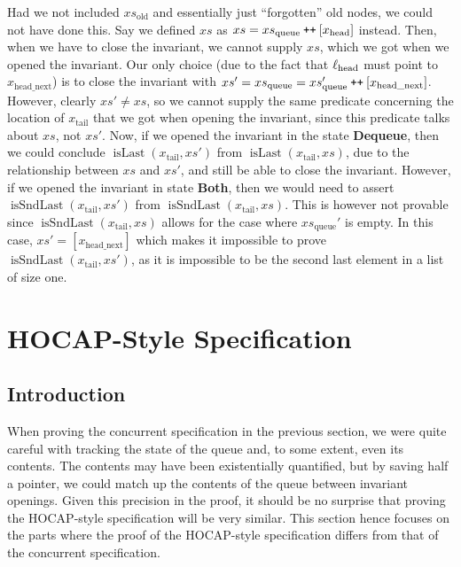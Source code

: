 \documentclass[a4paper, 10pt]{report}
\theoremstyle{definition}
\newcommand{\xsc}{xs}
\newcommand{\xsqueue}{xs_{\mathrm{queue}}}
\newcommand{\xsold}{xs_{\mathrm{old}}}
\newcommand{\isLast}{\operatorname{isLast}}
\newcommand{\isSndLast}{\operatorname{isSndLast}}
\newcommand{\locN}[1]{\loc_{\mathrm{#1}}}
\newcommand{\lochead}{\locN{head}}
\newcommand{\node}{x}
\newcommand{\nodeN}[1]{\node_{\mathrm{#1}}}
\newcommand{\nodehead}{\nodeN{head}}
\newcommand{\nodetail}{\nodeN{tail}}
\newcommand{\nodeheadnext}{\nodeN{head\_next}}
\newcommand{\DequeueState}{\textbf{Dequeue}\xspace}
\newcommand{\BothState}{\textbf{Both}\xspace}
\newcommand\catenate{\mathbin{\text{\ttfamily\upshape ++}}}
\begin{document}
Had we not included $\xsold$ and essentially just ``forgotten'' old nodes, we could not have done this. Say we defined $\xsc$ as $\xsc = \xsqueue \catenate [\nodehead]$ instead. Then, when we have to close the invariant, we cannot supply $\xsc$, which we got when we opened the invariant. Our only choice (due to the fact that $\lochead$ must point to $\nodeheadnext$) is to close the invariant with $\xsc' = \xsqueue = \xsqueue' \catenate [\nodeheadnext]$. However, clearly $\xsc' \neq \xsc$, so we cannot supply the same predicate concerning the location of $\nodetail$ that we got when opening the invariant, since this predicate talks about $\xsc$, not $\xsc'$. Now, if we opened the invariant in the state \DequeueState, then we could conclude $\isLast(\nodetail, \xsc')$ from $\isLast(\nodetail, \xsc)$, due to the relationship between $\xsc$ and $\xsc'$, and still be able to close the invariant. However, if we opened the invariant in state \BothState, then we would need to assert $\isSndLast(\nodetail, \xsc')$ from $\isSndLast(\nodetail, \xsc)$. This is however not provable since $\isSndLast(\nodetail, \xsc)$ allows for the case where $\xsqueue'$ is empty. In this case, $\xsc' = [\nodeheadnext]$ which makes it impossible to prove $\isSndLast(\nodetail, \xsc')$, as it is impossible to be the second last element in a list of size one.

\section{HOCAP-Style Specification}
\label{TLMSQSPECS:section:hocap}

\subsection{Introduction}
\label{TLMSQSPECS:hocap:sub:intro}

When proving the concurrent specification in the previous section, we were quite careful with tracking the state of the queue and, to some extent, even its contents. The contents may have been existentially quantified, but by saving half a pointer, we could match up the contents of the queue between invariant openings. Given this precision in the proof, it should be no surprise that proving the HOCAP-style specification will be very similar. This section hence focuses on the parts where the proof of the HOCAP-style specification differs from that of the concurrent specification.
\end{document}
